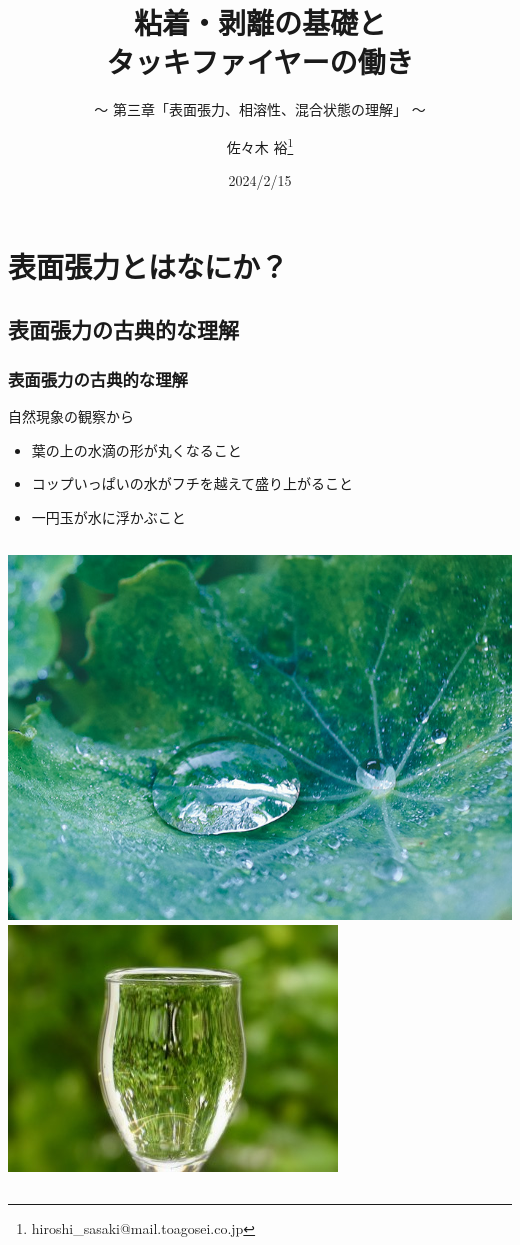 \documentclass[unicode,12pt]{beamer}%
\title{粘着・剥離の基礎と\\タッキファイヤーの働き}
\subtitle{～ 第三章「表面張力、相溶性、混合状態の理解」 ～}
\author[東亞合成 佐々木]{佐々木 裕\thanks{hiroshi\_sasaki@mail.toagosei.co.jp}}
\institute[東亞合成]{東亞合成株式会社}
\date{2024/2/15}
\begin{document}
\maketitle

\begin{frame} 
    \tableofcontents[]
\end{frame} 

\section{表面張力とはなにか？}

\subsection{表面張力の古典的な理解}
\begin{frame}
	\frametitle{表面張力の古典的な理解}
	\begin{block}{自然現象の観察から}
		\begin{itemize}
			\item 葉の上の水滴の形が丸くなること
			\item コップいっぱいの水がフチを越えて盛り上がること
			\item 一円玉が水に浮かぶこと
		\end{itemize}
		\begin{columns}[c, onlytextwidth]
			\centering
			\includegraphics[width=.6\textwidth]{waterdrop.png}
			\centering
			\includegraphics[width=.6\textwidth]{hyoumen_cup.jpg}

\end{columns}
\end{block}
\end{frame}
\end{document}
